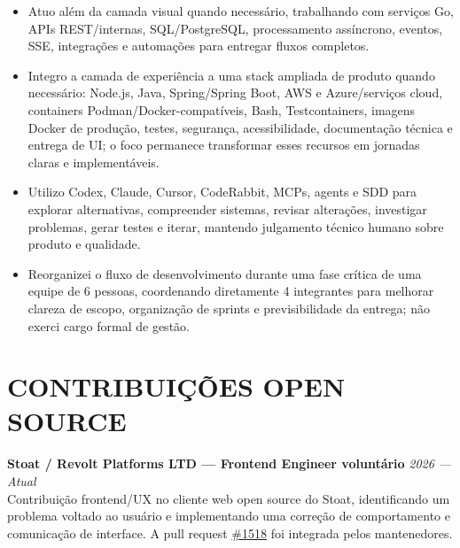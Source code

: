 \documentclass[10pt,a4paper]{article}
\begin{document}
\begin{itemize}
\item Atuo além da camada visual quando necessário, trabalhando com serviços Go, APIs REST/internas, SQL/PostgreSQL, processamento assíncrono, eventos, SSE, integrações e automações para entregar fluxos completos.
\item Integro a camada de experiência a uma stack ampliada de produto quando necessário: Node.js, Java, Spring/Spring Boot, AWS e Azure/serviços cloud, containers Podman/Docker-compatíveis, Bash, Testcontainers, imagens Docker de produção, testes, segurança, acessibilidade, documentação técnica e entrega de UI; o foco permanece transformar esses recursos em jornadas claras e implementáveis.
\item Utilizo Codex, Claude, Cursor, CodeRabbit, MCPs, agents e SDD para explorar alternativas, compreender sistemas, revisar alterações, investigar problemas, gerar testes e iterar, mantendo julgamento técnico humano sobre produto e qualidade.
\item Reorganizei o fluxo de desenvolvimento durante uma fase crítica de uma equipe de 6 pessoas, coordenando diretamente 4 integrantes para melhorar clareza de escopo, organização de sprints e previsibilidade da entrega; não exerci cargo formal de gestão.
\end{itemize}

\section*{CONTRIBUIÇÕES OPEN SOURCE}
\textbf{Stoat / Revolt Platforms LTD — Frontend Engineer voluntário} \hfill \textit{2026 — Atual}\\
Contribuição frontend/UX no cliente web open source do Stoat, identificando um problema voltado ao usuário e implementando uma correção de comportamento e comunicação de interface. A pull request \href{https://github.com/stoatchat/for-web/pull/1518}{\#1518} foi integrada pelos mantenedores.
\end{document}
